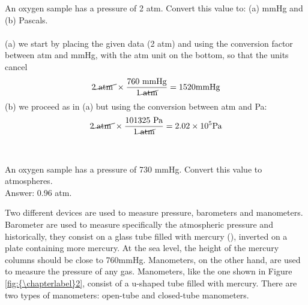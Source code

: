 \documentclass[main.tex]{subfiles}
\begin{document}
\begin{description}
\begin{example} %
An oxygen sample has a pressure of 2 atm. Convert this value to: (a) mmHg and (b) Pascals.
\\
\\
(a) we start by placing the given data (2 atm) and using the conversion factor between atm and mmHg, with the atm unit on the bottom, so that the units cancel
\begin{equation*}
2   \cancel{\text{ atm }} \times
\dfrac{760\text{ mmHg}  } {1\cancel{\text{ atm}}}=1520\text{mmHg}
\end{equation*}
(b) we proceed as in (a) but using the conversion between atm and Pa:
\begin{equation*}
2   \cancel{\text{ atm }} \times
\dfrac{101325\text{ Pa}  } {1\cancel{\text{ atm}}}=2.02\times 10^{5}\text{Pa}
\end{equation*}
\\
\faDiamond\ \\
An oxygen sample has a pressure of 730 mmHg. Convert this value to atmospheres.
\\
\flushright Answer: 0.96 atm.
\end{example}%


\item[\docfilehook{Measuring pressure}{Measuring pressure}] 
Two different devices are used to measure pressure, barometers and manometers. Barometer are used to measure specifically the atmospheric pressure and historically, they consist on a glass tube filled with mercury (), inverted on a plate containing more mercury. At the sea level, the height of the mercury columns should be close to 760mmHg.
Manometers, on the other hand, are used to measure the pressure of any gas. Manometers, like the one shown in Figure \ref{fig:{\chapterlabel}2}, consist of a u-shaped tube filled with mercury. There are two types of manometers: open-tube and closed-tube manometers.



\end{description}
\end{document}
